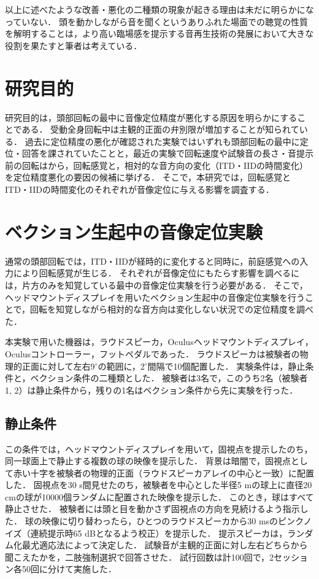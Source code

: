 \documentclass[12pt,a4j]{jsarticle}
\renewcommand{\ }{\hspace{1zw}}
\begin{document}
以上に述べたような改善・悪化の二種類の現象が起きる理由は未だに明らかになっていない．
頭を動かしながら音を聞くというありふれた場面での聴覚の性質を解明することは，より高い臨場感を提示する音再生技術の発展において大きな役割を果たすと筆者は考えている．

\section{研究目的}
研究目的は，頭部回転の最中に音像定位精度が悪化する原因を明らかにすることである．
受動全身回転中は主観的正面の弁別限が増加することが知られている．
過去に定位精度の悪化が確認された実験ではいずれも頭部回転の最中に定位・回答を課されていたことと，最近の実験で回転速度や試験音の長さ・音提示前の回転はから，回転感覚と，相対的な音方向の変化（ITD・IIDの時間変化）を定位精度悪化の要因の候補に挙げる．
そこで，本研究では，回転感覚とITD・IIDの時間変化のそれぞれが音像定位に与える影響を調査する．

\section{ベクション生起中の音像定位実験}
通常の頭部回転では，ITD・IIDが経時的に変化すると同時に，前庭感覚への入力により回転感覚が生じる．
それぞれが音像定位にもたらす影響を調べるには，片方のみを知覚している最中の音像定位実験を行う必要がある．
そこで，ヘッドマウントディスプレイを用いたベクション生起中の音像定位実験を行うことで，回転を知覚しながら相対的な音方向は変化しない状況での定位精度を調べた．

本実験で用いた機器は，ラウドスピーカ，Oculusヘッドマウントディスプレイ，Oculusコントローラー，フットペダルであった．
ラウドスピーカは被験者の物理的正面に対して左右9$^\circ$の範囲に，2$^\circ$間隔で10個配置した．
実験条件は，静止条件と，ベクション条件の二種類とした．
被験者は3名で，このうち2名（被験者1, 2）は静止条件から，残りの1名はベクション条件から先に実験を行った．

\subsection{静止条件}
この条件では，ヘッドマウントディスプレイを用いて，固視点を提示したのち，同一球面上で静止する複数の球の映像を提示した．
背景は暗闇で，固視点として赤い十字を被験者の物理的正面（ラウドスピーカアレイの中心と一致）に配置した．
固視点を30 s間見せたのち，被験者を中心とした半径5 mの球上に直径20 cmの球が10000個ランダムに配置された映像を提示した．
このとき，球はすべて静止させた．
被験者には頭と目を動かさず固視点の方向を見続けるよう指示した．
球の映像に切り替わったら，ひとつのラウドスピーカから30 msのピンクノイズ（連続提示時65 dBとなるよう校正）を提示した．
提示スピーカは，ランダム化最尤適応法によって決定した．
試験音が主観的正面に対し左右どちらから聞こえたかを，二肢強制選択で回答させた．
試行回数は計100回で，2セッション各50回に分けて実施した．
\end{document}
